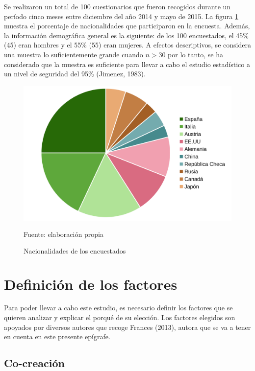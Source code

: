 

Se realizaron un total de 100 cuestionarios que fueron recogidos durante un período cinco meses entre diciembre del año 2014 y mayo de 2015. La figura \ref{fig:nacionalidades} muestra el porcentaje de nacionalidades que participaron en la encuesta. Además, la información demográfica general es la siguiente: de los 100 encuestados, el 45\% (45) eran hombres y el 55\% (55) eran mujeres. A efectos descriptivos, se considera una muestra lo suficientemente grande cuando $ n>30 $ por lo tanto, se ha considerado que la muestra es suficiente para llevar a cabo el estudio estadístico a un nivel de seguridad del 95\% (Jimenez, 1983).

\begin{figure}[!h]
	\caption{Nacionalidades de los encuestados}
	\centering \includegraphics[width=120mm]{capitulos/graficos/nacionalidades} 
	\label{fig:nacionalidades} 
	
		\footnotesize
		Fuente: elaboración propia
\end{figure}

\section{Definición de los factores}

Para poder llevar a cabo este estudio, es necesario definir los factores que se quieren analizar y explicar el porqué de su elección. Los factores elegidos son apoyados por diversos autores que recoge Frances (2013), autora que se va a tener en cuenta en este presente epígrafe.

\subsection{Co-creación}

